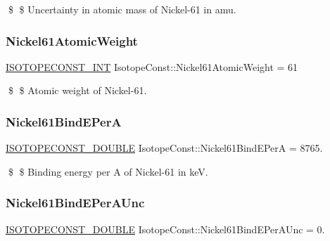 \$ \$ Uncertainty in atomic mass of Nickel-\/61 in amu. \mbox{\label{group___isotope_const-_nickel-_ni61_ga9b700f35fdee990d4093c7903ba86def}} 
\subsubsection{\texorpdfstring{Nickel61\+Atomic\+Weight}{Nickel61AtomicWeight}}
{\footnotesize\ttfamily \mbox{\hyperlink{group___isotope_const-_macros_ga5f18360b3e99483a35c32d789e62621c}{I\+S\+O\+T\+O\+P\+E\+C\+O\+N\+S\+T\+\_\+\+I\+NT}} Isotope\+Const\+::\+Nickel61\+Atomic\+Weight = 61}

\$ \$ Atomic weight of Nickel-\/61. \mbox{\label{group___isotope_const-_nickel-_ni61_ga3ea1ebb5bf32c8526df6e8a1672f2eab}} 
\subsubsection{\texorpdfstring{Nickel61\+Bind\+E\+PerA}{Nickel61BindEPerA}}
{\footnotesize\ttfamily \mbox{\hyperlink{group___isotope_const-_macros_ga8f45a7272ce02c0b4c65c44636ed719a}{I\+S\+O\+T\+O\+P\+E\+C\+O\+N\+S\+T\+\_\+\+D\+O\+U\+B\+LE}} Isotope\+Const\+::\+Nickel61\+Bind\+E\+PerA = 8765.}

\$ \$ Binding energy per A of Nickel-\/61 in keV. \mbox{\label{group___isotope_const-_nickel-_ni61_ga488e75c746cf6f02c496797a93e80f21}} 
\subsubsection{\texorpdfstring{Nickel61\+Bind\+E\+Per\+A\+Unc}{Nickel61BindEPerAUnc}}
{\footnotesize\ttfamily \mbox{\hyperlink{group___isotope_const-_macros_ga8f45a7272ce02c0b4c65c44636ed719a}{I\+S\+O\+T\+O\+P\+E\+C\+O\+N\+S\+T\+\_\+\+D\+O\+U\+B\+LE}} Isotope\+Const\+::\+Nickel61\+Bind\+E\+Per\+A\+Unc = 0.}


